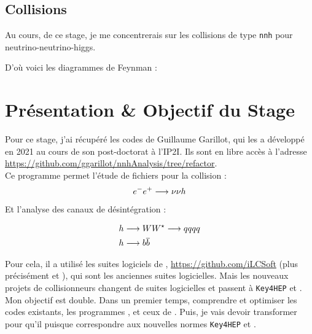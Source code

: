 \subsection{Collisions}

Au cours, de ce stage, je me concentrerais sur les collisions de type \texttt{nnh} pour neutrino-neutrino-higgs.

D'où voici les diagrammes de Feynman :

\begin{figure}
	\centering
	\begin{tikzpicture}
	
	\end{tikzpicture}
	\label{feynmann}
\end{figure}

\section{Présentation \& Objectif du Stage}

Pour ce stage, j'ai récupéré les codes de Guillaume Garillot, qui les a développé en 2021 au cours de son post-doctorat à l'IP2I. 
Ils sont en libre accès à l'adresse \url{https://github.com/ggarillot/nnhAnalysis/tree/refactor}.\\

Ce programme \nnhAnalysis permet l'étude de fichiers \SLCIO pour la collision :
\begin{equation}
	\positron \electron \longrightarrow \nnh
\end{equation}

Et l'analyse des canaux de désintégration :

\begin{align}
	h &\longrightarrow W \Wstar \longrightarrow qqqq \\
	h &\longrightarrow b \bbar 
\end{align}

Pour cela, il a utilisé les suites logiciels de \iLCSoft, \url{https://github.com/iLCSoft} (plus précisément \LCIO et \Marlin), qui sont les anciennes suites logicielles.
Mais les nouveaux projets de collisionneurs changent de suites logicielles et passent à \texttt{Key4HEP} et \Gaudi.\\

Mon objectif est double. Dans un premier temps, comprendre et optimiser les codes existants, \cad les programmes \LCIO, \Marlin et ceux de \nnhAnalysis. Puis, je vais devoir transformer \nnhAnalysis pour qu'il puisque correspondre aux nouvelles normes \texttt{Key4HEP} et \Gaudi.